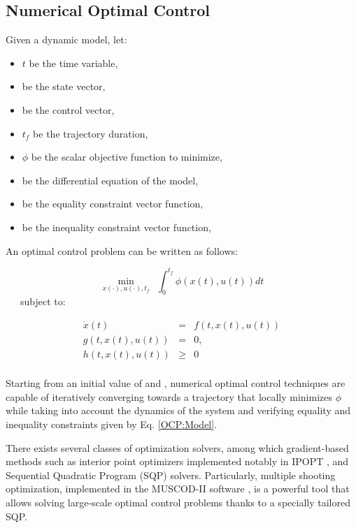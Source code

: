 \subsection{Numerical Optimal Control}
Given a dynamic model, let:
\begin{itemize}
\item $t$ be the time variable,
\item \state{} be the state vector, 
\item \control{} be the control vector,
\item $t_f$ be the trajectory duration,
\item $\phi$ be the scalar objective function to minimize,
\item \dfcn{} be the differential equation of the model,
\item \eqcstr{} be the equality constraint vector function,
\item \ineqcstr{} be the inequality constraint vector function,
\end{itemize}

An optimal control problem can be written as follows:

\label{OCP}
\begin{equation}
  \min_{x (\cdot), u (\cdot), t_f} \ \ 
  \int_{0}^{t_{f}}\phi (x(t), u(t))dt
  \label{OCP:Obj}
\end{equation}
\ \ \ subject to:

\begin{equation}
  \begin{array}{rcl}
  \dot{x} (t) & = & f(t, x(t), u(t)) \label{OCP:Model}
  \\
  g(t, x(t), u(t)) & = & 0,
  \\
  h(t, x(t), u(t)) & \ge & 0%
  \\
  \end{array}
\end{equation} 

Starting from an initial value of \state{} and \control{}, numerical
optimal control techniques are capable of iteratively converging
towards a trajectory that locally minimizes $\phi$ while taking into
account the dynamics of the system and verifying equality and
inequality constraints given by Eq. \ref{OCP:Model}.

There exists several classes of optimization solvers, among which
gradient-based methods such as interior point optimizers implemented
notably in IPOPT \cite{Biegler2009}, and Sequential Quadratic Program
(SQP) solvers. Particularly, multiple shooting optimization,
implemented in the \textsc{MUSCOD-II} software \cite{Leineweber2003},
is a powerful tool that allows solving large-scale optimal control
problems thanks to a specially tailored SQP.

